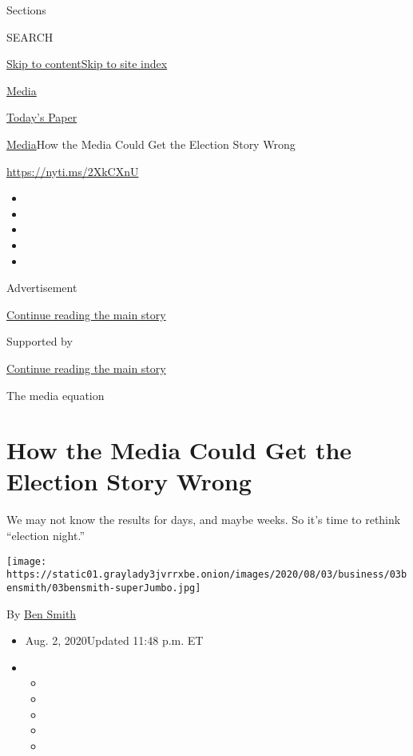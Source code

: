 Sections

SEARCH

\protect\hyperlink{site-content}{Skip to
content}\protect\hyperlink{site-index}{Skip to site index}

\href{https://www.nytimes3xbfgragh.onion/section/business/media}{Media}

\href{https://myaccount.nytimes3xbfgragh.onion/auth/login?response_type=cookie\&client_id=vi}{}

\href{https://www.nytimes3xbfgragh.onion/section/todayspaper}{Today's
Paper}

\href{/section/business/media}{Media}\textbar{}How the Media Could Get
the Election Story Wrong

\url{https://nyti.ms/2XkCXnU}

\begin{itemize}
\item
\item
\item
\item
\item
\end{itemize}

Advertisement

\protect\hyperlink{after-top}{Continue reading the main story}

Supported by

\protect\hyperlink{after-sponsor}{Continue reading the main story}

The media equation

\hypertarget{how-the-media-could-get-the-election-story-wrong}{%
\section{How the Media Could Get the Election Story
Wrong}\label{how-the-media-could-get-the-election-story-wrong}}

We may not know the results for days, and maybe weeks. So it's time to
rethink ``election night.''

\texttt{[image: https://static01.graylady3jvrrxbe.onion/images/2020/08/03/business/03bensmith/03bensmith-superJumbo.jpg]}

By \href{https://www.nytimes3xbfgragh.onion/by/ben-smith}{Ben Smith}

\begin{itemize}
\item
  Aug. 2, 2020Updated 11:48 p.m. ET
\item
  \begin{itemize}
  \item
  \item
  \item
  \item
  \item
  \end{itemize}
\end{itemize}

